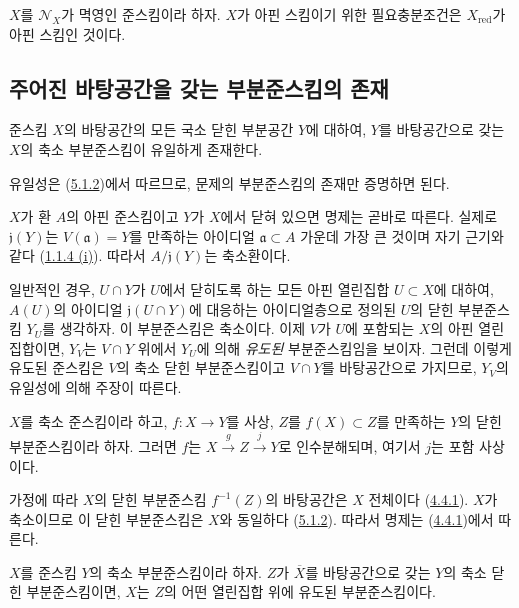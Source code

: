 \begin{corollary}[5.1.10]
\label{I.5.1.10-ko}
$X$를 $\mathscr{N}_X$가 멱영인 준스킴이라 하자. $X$가 아핀 스킴이기
위한 필요충분조건은 $X_{\mathrm{red}}$가 아핀 스킴인 것이다.
\end{corollary}

\subsection{주어진 바탕공간을 갖는 부분준스킴의 존재}
\label{subsection:I.5.2-ko}

\begin{proposition}[5.2.1]
\label{I.5.2.1-ko}
준스킴 $X$의 바탕공간의 모든 국소 닫힌 부분공간 $Y$에 대하여,
$Y$를 바탕공간으로 갖는 $X$의 축소 부분준스킴이 유일하게 존재한다.
\end{proposition}

유일성은 (\hyperref[I.5.1.2-ko]{5.1.2})에서 따르므로, 문제의
부분준스킴의 존재만 증명하면 된다.

$X$가 환 $A$의 아핀 준스킴이고 $Y$가 $X$에서 닫혀 있으면 명제는
곧바로 따른다. 실제로 $\mathfrak{j}(Y)$는
$V(\mathfrak{a})=Y$를 만족하는 아이디얼 $\mathfrak{a}\subset A$ 가운데
가장 큰 것이며 자기 근기와 같다
(\hyperref[I.1.1.4-ko]{1.1.4 (i)}). 따라서
$A/\mathfrak{j}(Y)$는 축소환이다.

일반적인 경우, $U\cap Y$가 $U$에서 닫히도록 하는 모든 아핀
열린집합 $U\subset X$에 대하여, $A(U)$의 아이디얼
$\mathfrak{j}(U\cap Y)$에 대응하는 아이디얼층으로 정의된 $U$의 닫힌
부분준스킴 $Y_U$를 생각하자. 이 부분준스킴은 축소이다. 이제 $V$가
$U$에 포함되는 $X$의 아핀 열린집합이면, $Y_V$는 $V\cap Y$ 위에서
$Y_U$에 의해 \emph{유도된} 부분준스킴임을 보이자. 그런데 이렇게
유도된 준스킴은 $V$의 축소 닫힌 부분준스킴이고 $V\cap Y$를
바탕공간으로 가지므로, $Y_V$의 유일성에 의해 주장이 따른다.

\begin{proposition}[5.2.2]
\label{I.5.2.2-ko}
$X$를 축소 준스킴이라 하고, $f:X\to Y$를 사상, $Z$를
$f(X)\subset Z$를 만족하는 $Y$의 닫힌 부분준스킴이라 하자. 그러면 $f$는
$X\xrightarrow{g}Z\xrightarrow{j}Y$로 인수분해되며, 여기서 $j$는 포함
사상이다.
\end{proposition}

가정에 따라 $X$의 닫힌 부분준스킴 $f^{-1}(Z)$의 바탕공간은 $X$
전체이다 (\hyperref[I.4.4.1-ko]{4.4.1}). $X$가 축소이므로 이 닫힌
부분준스킴은 $X$와 동일하다 (\hyperref[I.5.1.2-ko]{5.1.2}). 따라서
명제는 (\hyperref[I.4.4.1-ko]{4.4.1})에서 따른다.

\begin{corollary}[5.2.3]
\label{I.5.2.3-ko}
$X$를 준스킴 $Y$의 축소 부분준스킴이라 하자. $Z$가 $\overline{X}$를
바탕공간으로 갖는 $Y$의 축소 닫힌 부분준스킴이면, $X$는 $Z$의 어떤
열린집합 위에 유도된 부분준스킴이다.
\end{corollary}

